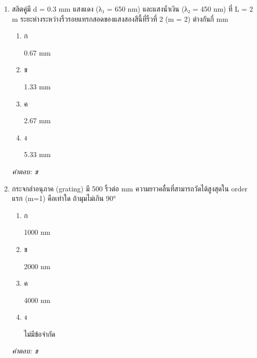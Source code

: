 \documentclass[12pt]{article}
\begin{document}
\begin{enumerate}[label=\arabic*., itemsep=0.5\baselineskip, topsep=0.5\baselineskip, leftmargin=*]
\item สลิตคู่มี d = 0.3 mm แสงแดง (λ₁ = 650 nm) และแสงน้ำเงิน (λ₂ = 450 nm) ที่ L = 2 m ระยะห่างระหว่างริ้วรอยแทรกสอดของแสงสองสีนี้ที่ริ้วที่ 2 (m = 2) ต่างกันกี่ mm
\begin{enumerate}[label=\alph*)., itemsep=0.3\baselineskip, topsep=0.3\baselineskip]
\item ก\ 
\begin{minipage}[t]{0.9\linewidth}
\raggedright 0.67 mm
\end{minipage}
\item ข\ 
\begin{minipage}[t]{0.9\linewidth}
\raggedright 1.33 mm
\end{minipage}
\item ค\ 
\begin{minipage}[t]{0.9\linewidth}
\raggedright 2.67 mm
\end{minipage}
\item ง\ 
\begin{minipage}[t]{0.9\linewidth}
\raggedright 5.33 mm
\end{minipage}
\end{enumerate}
\vspace{-0.3\baselineskip}
\begin{small}
\textit{คำตอบ: ข}
\end{small}

\item กระจกลำอนุภาค (grating) มี 500 ริ้วต่อ mm ความยาวคลื่นที่สามารถวัดได้สูงสุดใน order แรก (m=1) คือเท่าใด ถ้ามุมไม่เกิน 90°
\begin{enumerate}[label=\alph*)., itemsep=0.3\baselineskip, topsep=0.3\baselineskip]
\item ก\ 
\begin{minipage}[t]{0.9\linewidth}
\raggedright 1000 nm
\end{minipage}
\item ข\ 
\begin{minipage}[t]{0.9\linewidth}
\raggedright 2000 nm
\end{minipage}
\item ค\ 
\begin{minipage}[t]{0.9\linewidth}
\raggedright 4000 nm
\end{minipage}
\item ง\ 
\begin{minipage}[t]{0.9\linewidth}
\raggedright ไม่มีข้อจำกัด
\end{minipage}
\end{enumerate}
\vspace{-0.3\baselineskip}
\begin{small}
\textit{คำตอบ: ข}
\end{small}


\end{enumerate}
\end{document}
